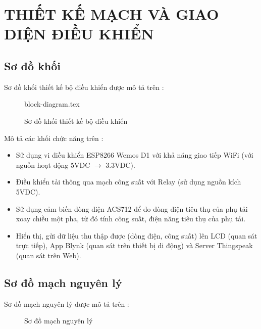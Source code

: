 \chapter{THIẾT KẾ MẠCH VÀ GIAO DIỆN ĐIỀU KHIỂN}

\section{Sơ đồ khối}
    Sơ đồ khối thiết kế bộ điều khiển được mô tả trên \fig{\ref{Fig:block-diagram}}:

    \begin{figure}[htp]
        \begin{center}
            {block-diagram.tex}
        \end{center}
        \caption{Sơ đồ khối thiết kế bộ điều khiển} \label{Fig:block-diagram}
    \end{figure}

    Mô tả các khối chức năng trên \fig{\ref{Fig:block-diagram}}:
    \begin{itemize}
        \item Sử dụng vi điều khiển ESP8266 Wemos D1 với khả năng giao tiếp WiFi (với nguồn hoạt động 5VDC $\rightarrow$ 3.3VDC).
        \item Điều khiển tải thông qua mạch công suất với Relay (sử dụng nguồn kích 5VDC).
        \item Sử dụng cảm biến dòng điện ACS712 để đo dòng điện tiêu thụ của phụ tải xoay chiều một pha, từ đó tính công suất, điện năng tiêu thụ của phụ tải.
        \item Hiển thị, gửi dữ liệu thu thập được (dòng điện, công suất) lên LCD (quan sát trực tiếp), App Blynk (quan sát trên thiết bị di động) và Server Thingspeak (quan sát trên Web).
    \end{itemize}

\section{Sơ đồ mạch nguyên lý}
    Sơ đồ mạch nguyên lý được mô tả trên \fig{\ref{Fig:powerACS712_schem}}:
        \begin{figure}[htp]
            \begin{center}
            \end{center}
            \caption{Sơ đồ mạch nguyên lý} \label{Fig:powerACS712_schem}
        \end{figure}


